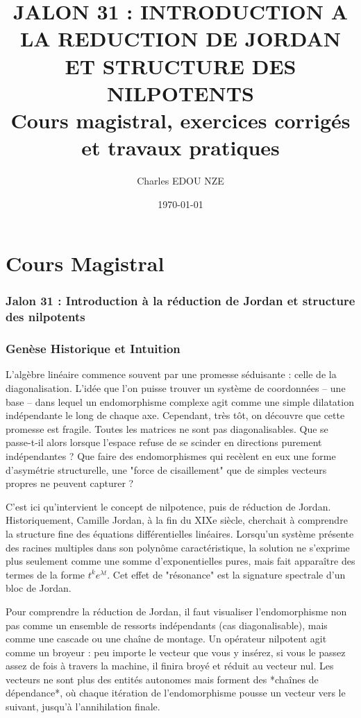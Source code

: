 \documentclass[11pt,a4paper]{article}
\title{\Huge JALON 31 : INTRODUCTION A LA REDUCTION DE JORDAN ET STRUCTURE DES NILPOTENTS \\ \large Cours magistral, exercices corrigés et travaux pratiques}
\author{\Large Charles EDOU NZE}
\date{\today}
\begin{document}
\maketitle
\tableofcontents
\newpage

\part{Cours Magistral}

\section{Jalon 31 : Introduction à la réduction de Jordan et structure des nilpotents}

\section{Genèse Historique et Intuition}

L'algèbre linéaire commence souvent par une promesse séduisante : celle de la diagonalisation. L'idée que l'on puisse trouver un système de coordonnées – une base – dans lequel un endomorphisme complexe agit comme une simple dilatation indépendante le long de chaque axe. Cependant, très tôt, on découvre que cette promesse est fragile. Toutes les matrices ne sont pas diagonalisables. Que se passe-t-il alors lorsque l'espace refuse de se scinder en directions purement indépendantes ? Que faire des endomorphismes qui recèlent en eux une forme d'asymétrie structurelle, une "force de cisaillement" que de simples vecteurs propres ne peuvent capturer ?

C'est ici qu'intervient le concept de nilpotence, puis de réduction de Jordan. Historiquement, Camille Jordan, à la fin du XIXe siècle, cherchait à comprendre la structure fine des équations différentielles linéaires. Lorsqu'un système présente des racines multiples dans son polynôme caractéristique, la solution ne s'exprime plus seulement comme une somme d'exponentielles pures, mais fait apparaître des termes de la forme $t^k e^{\lambda t}$. Cet effet de "résonance" est la signature spectrale d'un bloc de Jordan.

Pour comprendre la réduction de Jordan, il faut visualiser l'endomorphisme non pas comme un ensemble de ressorts indépendants (cas diagonalisable), mais comme une cascade ou une chaîne de montage. Un opérateur nilpotent agit comme un broyeur : peu importe le vecteur que vous y insérez, si vous le passez assez de fois à travers la machine, il finira broyé et réduit au vecteur nul. Les vecteurs ne sont plus des entités autonomes mais forment des *chaînes de dépendance*, où chaque itération de l'endomorphisme pousse un vecteur vers le suivant, jusqu'à l'annihilation finale.
\end{document}
